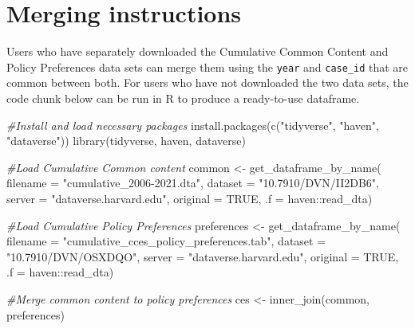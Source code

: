 \documentclass[
  12pt]{article}
\newenvironment{Shaded}{\begin{snugshade}}{\end{snugshade}}
\newcommand{\AttributeTok}[1]{\textcolor[rgb]{0.77,0.63,0.00}{#1}}
\newcommand{\CommentTok}[1]{\textcolor[rgb]{0.56,0.35,0.01}{\textit{#1}}}
\newcommand{\ConstantTok}[1]{\textcolor[rgb]{0.00,0.00,0.00}{#1}}
\newcommand{\FunctionTok}[1]{\textcolor[rgb]{0.00,0.00,0.00}{#1}}
\newcommand{\NormalTok}[1]{#1}
\newcommand{\OtherTok}[1]{\textcolor[rgb]{0.56,0.35,0.01}{#1}}
\newcommand{\SpecialCharTok}[1]{\textcolor[rgb]{0.00,0.00,0.00}{#1}}
\newcommand{\StringTok}[1]{\textcolor[rgb]{0.31,0.60,0.02}{#1}}
\begin{document}
\hypertarget{merging-instructions}{%
\section{Merging instructions}\label{merging-instructions}}

Users who have separately downloaded the Cumulative Common Content and
Policy Preferences data sets can merge them using the \texttt{year} and
\texttt{case\_id} that are common between both. For users who have not
downloaded the two data sets, the code chunk below can be run in R to
produce a ready-to-use dataframe.

\bigskip

\begin{Shaded}
\begin{Highlighting}[]
\CommentTok{\#Install and load necessary packages}
\FunctionTok{install.packages}\NormalTok{(}\FunctionTok{c}\NormalTok{(}\StringTok{"tidyverse"}\NormalTok{, }\StringTok{"haven"}\NormalTok{, }\StringTok{"dataverse"}\NormalTok{))}
\FunctionTok{library}\NormalTok{(tidyverse, haven, dataverse)}

\CommentTok{\#Load Cumulative Common content}
\NormalTok{common }\OtherTok{\textless{}{-}} \FunctionTok{get\_dataframe\_by\_name}\NormalTok{(}
    \AttributeTok{filename =} \StringTok{"cumulative\_2006{-}2021.dta"}\NormalTok{,}
    \AttributeTok{dataset =} \StringTok{"10.7910/DVN/II2DB6"}\NormalTok{,}
    \AttributeTok{server =} \StringTok{"dataverse.harvard.edu"}\NormalTok{,}
    \AttributeTok{original =} \ConstantTok{TRUE}\NormalTok{,}
    \AttributeTok{.f =}\NormalTok{ haven}\SpecialCharTok{::}\NormalTok{read\_dta)}

\CommentTok{\#Load Cumulative Policy Preferences}
\NormalTok{preferences }\OtherTok{\textless{}{-}} \FunctionTok{get\_dataframe\_by\_name}\NormalTok{(}
    \AttributeTok{filename =} \StringTok{"cumulative\_cces\_policy\_preferences.tab"}\NormalTok{,}
    \AttributeTok{dataset =} \StringTok{"10.7910/DVN/OSXDQO"}\NormalTok{,}
    \AttributeTok{server =} \StringTok{"dataverse.harvard.edu"}\NormalTok{,}
    \AttributeTok{original =} \ConstantTok{TRUE}\NormalTok{,}
    \AttributeTok{.f =}\NormalTok{ haven}\SpecialCharTok{::}\NormalTok{read\_dta)}

\CommentTok{\#Merge common content to policy preferences}
\NormalTok{ces }\OtherTok{\textless{}{-}} \FunctionTok{inner\_join}\NormalTok{(common, preferences)}
\end{Highlighting}
\end{Shaded}
\end{document}
